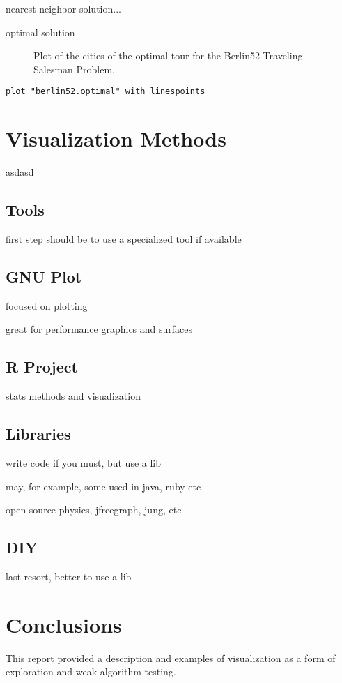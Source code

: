 \documentclass[a4paper, 11pt]{article}
\begin{document}
nearest neighbor solution...


optimal solution

\begin{figure}[htp]

\caption{Plot of the cities of the optimal tour for the Berlin52 Traveling Salesman Problem.}
\label{plot:tsp2}
\end{figure}

\begin{lstlisting}[caption=Plot cities and draw optimal tour from the Berlin52 Traveling Salesman Problem, label=tsp2]
plot "berlin52.optimal" with linespoints
\end{lstlisting}


%
%
\section{Visualization Methods}
asdasd

\subsection{Tools}
first step should be to use a specialized tool if available

\subsection{GNU Plot}
focused on plotting

great for performance graphics and surfaces

\subsection{R Project}
stats methods and visualization


\subsection{Libraries}
write code if you must, but use a lib

may, for example, some used in java, ruby etc

open source physics, jfreegraph, jung, etc


\subsection{DIY}
last resort, better to use a lib


%
%
\section{Conclusions}
\label{sec:conclusions}
This report provided a description and examples of visualization as a form of exploration and weak algorithm testing. 



\end{document}
